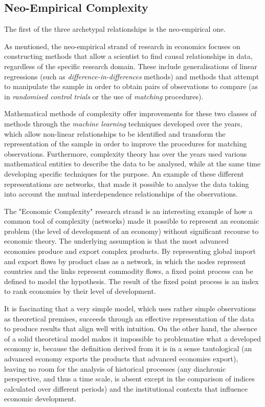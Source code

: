 \subsection{Neo-Empirical Complexity}
The first of the three archetypal relationships is the neo-empirical one.

As mentioned, the neo-empirical strand of research in economics focuses on constructing methods that allow a scientist to find causal relationships in data, regardless of the specific research domain. These include generalisations of linear regressions (such as \textit{difference-in-differences} methods) and methods that attempt to manipulate the sample in order to obtain pairs of observations to compare (as in \textit{randomised control trials} or the use of \textit{matching} procedures).

Mathematical methods of complexity offer improvements for these two classes of methods through the \textit{machine learning} techniques developed over the years, which allow non-linear relationships to be identified and transform the representation of the sample in order to improve the procedures for matching observations.
Furthermore, complexity theory has over the years used various mathematical entities to describe the data to be analysed, while at the same time developing specific techniques for the purpose.
An example of these different representations are networks, that made it possible to analyse the data taking into account the mutual interdependence relationships of the observations.

The "Economic Complexity" research strand \parencite{hidalgo2021} is an interesting example of how a common tool of complexity (networks) made it possible to represent an economic problem (the level of development of an economy) without significant recourse to economic theory.
The underlying assumption is that the most advanced economies produce and export complex products.
By representing global import and export flows by product class as a network, in which the nodes represent countries and the links represent commodity flows, a fixed point process can be defined to model the hypothesis.
The result of the fixed point process is an index to rank economies by their level of development.

It is fascinating that a very simple model, which uses rather simple observations as theoretical premises, succeeds through an effective representation of the data to produce results that align well with intuition.
On the other hand, the absence of a solid theoretical model makes it impossible to problematise what a developed economy is, because the definition derived from it is in a sense tautological (an advanced economy exports the products that advanced economies export), leaving no room for the analysis of historical processes (any diachronic perspective, and thus a time scale, is absent except in the comparison of indices calculated over different periods) and the institutional contexts that influence economic development.

